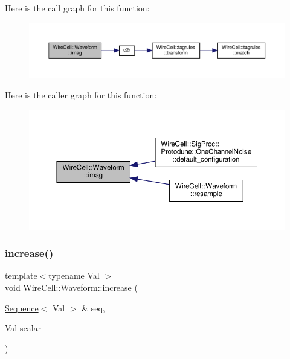 Here is the call graph for this function\+:
\nopagebreak
\begin{figure}[H]
\begin{center}
\leavevmode
\includegraphics[width=350pt]{namespace_wire_cell_1_1_waveform_acc803e535b3e979dc331088b9fba8bc1_cgraph}
\end{center}
\end{figure}
Here is the caller graph for this function\+:
\nopagebreak
\begin{figure}[H]
\begin{center}
\leavevmode
\includegraphics[width=350pt]{namespace_wire_cell_1_1_waveform_acc803e535b3e979dc331088b9fba8bc1_icgraph}
\end{center}
\end{figure}
\mbox{\label{namespace_wire_cell_1_1_waveform_af74deccaeb9e2147865029e16840e799}} 
\subsubsection{\texorpdfstring{increase()}{increase()}\hspace{0.1cm}{\footnotesize\ttfamily [1/3]}}
{\footnotesize\ttfamily template$<$typename Val $>$ \\
void Wire\+Cell\+::\+Waveform\+::increase (\begin{DoxyParamCaption}\item[{\hyperlink{namespace_wire_cell_1_1_waveform_a1d2a1b672e3b220dcd64a994531de95d}{Sequence}$<$ Val $>$ \&}]{seq,  }\item[{Val}]{scalar }\end{DoxyParamCaption})}



